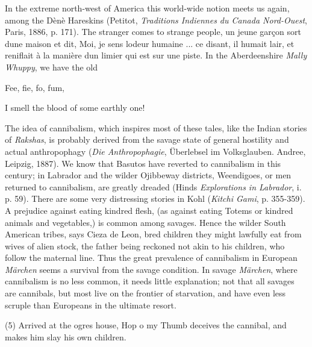 \documentclass[14pt,a4paper]{memoir}
\begin{document}
{In the extreme north-west of America this world-wide notion meets us
again, among the Dènè Hareskins (Petitot, \emph{Traditions Indiennes du
Canada Nord-Ouest}, Paris, 1886, p. 171). The stranger comes to strange
people, \textquotesingle un jeune garçon sort d\textquotesingle une
maison et dit, Moi, je sens l\textquotesingle odeur humaine ... ce
disant, il humait l\textquotesingle air, et reniflait à la manière
d\textquotesingle un limier qui est sur une piste.\textquotesingle{} In
the Aberdeenshire \emph{Mally Whuppy}, we have the old

{Fee, fie, fo, fum,} {I smell the blood of some earthly
one!

The idea of cannibalism, which inspires most of these tales, like the
Indian stories of \emph{Rakshas}, is probably derived from the savage
state of general hostility and actual anthropophagy (\emph{Die
Anthropophagie}, Überlebsel im Volksglauben.\textquotesingle{} Andree,
Leipzig, 1887). We know that Basutos have reverted to cannibalism in
this century; in Labrador and the wilder Ojibbeway districts,
Weendigoes, or men returned to cannibalism, are greatly dreaded
(Hind\textquotesingle s \emph{Explorations in Labrador}, i. p. 59).
There are some very distressing stories in Kohl (\emph{Kitchi Gami}, p.
355-359). A prejudice against eating kindred flesh, (as against eating
Totems or kindred animals and vegetables,) is common among savages.
Hence the wilder South American tribes, says Cieza de Leon, bred
children they might lawfully eat from wives of alien stock, the father
being reckoned not akin to his children, who follow the maternal line.
Thus the great prevalence of cannibalism in European \emph{Märchen}
seems a survival from the savage condition. In savage \emph{Märchen},
where cannibalism is no less common, it needs little explanation; not
that all savages are cannibals, but most live on the frontier of
starvation, and have even less scruple than Europeans in the ultimate
resort.

(5) Arrived at the ogre\textquotesingle s house, Hop o\textquotesingle{}
my Thumb deceives the cannibal, and makes him slay his own children.

}}
\end{document}
